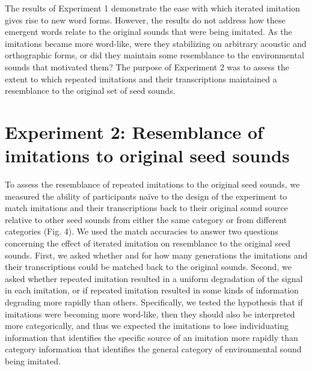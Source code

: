 \documentclass[english,floatsintext,man]{apa6}
\theoremstyle{definition}
\theoremstyle{definition}
\theoremstyle{definition}
\theoremstyle{remark}
\begin{document}
The results of Experiment 1 demonstrate the ease with which iterated
imitation gives rise to new word forms. However, the results do not
address how these emergent words relate to the original sounds that were
being imitated. As the imitations became more word-like, were they
stabilizing on arbitrary acoustic and orthographic forms, or did they
maintain some resemblance to the environmental sounds that motivated
them? The purpose of Experiment 2 was to assess the extent to which
repeated imitations and their transcriptions maintained a resemblance to
the original set of seed sounds.

\hypertarget{experiment-2-resemblance-of-imitations-to-original-seed-sounds}{%
\section{Experiment 2: Resemblance of imitations to original seed
sounds}\label{experiment-2-resemblance-of-imitations-to-original-seed-sounds}}

To assess the resemblance of repeated imitations to the original seed
sounds, we measured the ability of participants naïve to the design of
the experiment to match imitations and their transcriptions back to
their original sound source relative to other seed sounds from either
the same category or from different categories (Fig. 4). We used the
match accuracies to answer two questions concerning the effect of
iterated imitation on resemblance to the original seed sounds. First, we
asked whether and for how many generations the imitations and their
transcriptions could be matched back to the original sounds. Second, we
asked whether repeated imitation resulted in a uniform degradation of
the signal in each imitation, or if repeated imitation resulted in some
kinds of information degrading more rapidly than others. Specifically,
we tested the hypothesis that if imitations were becoming more
word-like, then they should also be interpreted more categorically, and
thus we expected the imitations to lose individuating information that
identifies the specific source of an imitation more rapidly than
category information that identifies the general category of
environmental sound being imitated.
\end{document}
